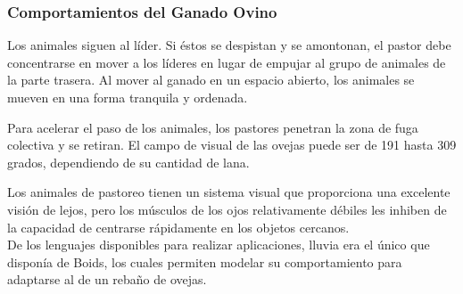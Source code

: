 \subsubsection{Comportamientos del Ganado Ovino}
\label{subsubsection:comportamientos}

Los animales siguen al líder. Si éstos se despistan y se amontonan, el pastor debe concentrarse en mover a los líderes en lugar de empujar 
al grupo de animales de la parte trasera. Al mover al ganado en un espacio abierto, los animales se mueven en una forma tranquila y ordenada. 

Para acelerar el paso de los animales, los pastores penetran la zona de fuga colectiva y se retiran. El campo de visual de las ovejas puede 
ser de 191 hasta 309 grados, dependiendo de su cantidad de lana.

Los animales de pastoreo tienen un sistema visual que proporciona una excelente visión de lejos, pero los músculos de los ojos relativamente 
débiles les inhiben de la capacidad de centrarse rápidamente en los objetos cercanos.\\

De los lenguajes disponibles para realizar aplicaciones, lluvia era el único que disponía de Boids, los cuales permiten modelar su 
comportamiento para adaptarse al de un rebaño de ovejas.




